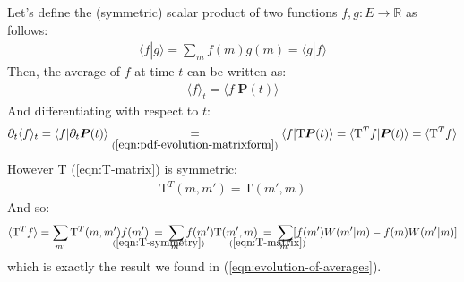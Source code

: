 \documentclass[../../main.tex]{subfiles}
\begin{document}
Let's define the (symmetric) scalar product of two functions $f, g\colon E \to \mathbb{R}$ as follows:
\begin{align*}
    \langle f|g \rangle = \sum_{m} f(m) g(m) = \langle g|f \rangle
\end{align*}
Then, the average of $f$ at time $t$ can be written as:
\begin{align*}
    \langle f \rangle_t = \langle f | \bm{P}(t) \rangle
\end{align*}
And differentiating with respect to $t$:
\begin{align} \label{eqn:average-evolution-matrix}
    \partial_t \langle f \rangle_t = \langle f|\partial_t \bm{P}(t) \rangle \underset{(\ref{eqn:pdf-evolution-matrixform})}{=}  \langle f | \mathrm{T} \bm{P}(t) \rangle = \langle \mathrm{T}^T f| \bm{P}(t) \rangle = \langle \mathrm{T}^T f \rangle
\end{align}
However $\mathrm{T}$ (\ref{eqn:T-matrix}) is symmetric:
\begin{align}\label{eqn:T-symmetry}
    \mathrm{T}^T(m,m') = \mathrm{T}(m',m)
\end{align}
And so:
\begin{align*}
    \langle \mathrm{T}^T f \rangle = \sum_{m'} \mathrm{T}^T(m,m') f(m')\> \underset{\mathclap{(\ref{eqn:T-symmetry})}}{=}\> \sum_{m'} f(m') \mathrm{T}(m',m) \>\underset{\mathclap{(\ref{eqn:T-matrix})}}{=} \> \sum_{m'} [f(m') W(m'|m) - f(m) W(m'|m)]
\end{align*}
which is exactly the result we found in (\ref{eqn:evolution-of-averages}).
\end{document}

